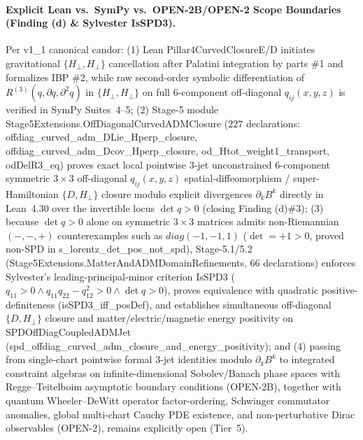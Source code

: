 \documentclass[american,11pt,letterpaper]{article}
\def\mathcal#1{#1}%
\def\mathrm#1{#1}%
\def\texttt#1{#1}%
\begin{document}
\paragraph{Explicit Lean vs.\ SymPy vs.\ \texttt{OPEN-2B}/\texttt{OPEN-2} Scope Boundaries (\texttt{Finding (d)} \& Sylvester \texttt{IsSPD3}).}
Per \texttt{v1\_1} canonical candor: (1) Lean \texttt{Pillar4\allowbreak{}Curved\allowbreak{}Closure\allowbreak{}E/D} initiates gravitational $\{\mathcal{H}_\perp,\mathcal{H}_\perp\}$ cancellation after Palatini integration by parts \#1 and formalizes IBP \#2, while raw second-order symbolic differentiation of $R^{(3)}(q,\partial q,\partial^2 q)$ in $\{\mathcal{H}_\perp,\mathcal{H}_\perp\}$ on full 6-component off-diagonal $q_{ij}(x,y,z)$ is verified in SymPy Suites~4--5; (2) Stage-5 module \texttt{Stage5\allowbreak{}Extensions.\allowbreak{}Off\allowbreak{}Diagonal\allowbreak{}Curved\allowbreak{}ADMClosure} ($227$ declarations: \texttt{offdiag\_\allowbreak{}curved\_\allowbreak{}adm\_\allowbreak{}DLie\_\allowbreak{}Hperp\_\allowbreak{}closure}, \texttt{offdiag\_\allowbreak{}curved\_\allowbreak{}adm\_\allowbreak{}Dcov\_\allowbreak{}Hperp\_\allowbreak{}closure}, \texttt{od\_\allowbreak{}Htot\_\allowbreak{}weight1\_\allowbreak{}transport}, \texttt{odDelR3\_eq}) proves exact local pointwise 3-jet unconstrained 6-component symmetric $3\times 3$ off-diagonal $q_{ij}(x,y,z)$ spatial-diffeomorphism / super-Hamiltonian $\{\mathcal{D},\mathcal{H}_\perp\}$ closure modulo explicit divergences $\partial_k B^k$ directly in Lean~4.30 over the invertible locus $\det q > 0$ (closing \texttt{Finding (d)\#3}); (3) because $\det q > 0$ alone on symmetric $3\times 3$ matrices admits non-Riemannian $(-,-,+)$ counterexamples such as $\mathrm{diag}(-1,-1,1)$ ($\det = +1 > 0$, proved non-SPD in \texttt{s\_\allowbreak{}lorentz\_\allowbreak{}det\_\allowbreak{}pos\_\allowbreak{}not\_\allowbreak{}spd}), Stage-5.1/5.2 (\texttt{Stage5\allowbreak{}Extensions.\allowbreak{}Matter\allowbreak{}And\allowbreak{}ADMDomain\allowbreak{}Refinements}, $66$ declarations) enforces Sylvester's leading-principal-minor criterion \texttt{IsSPD3} ($q_{11} > 0 \wedge q_{11}q_{22}-q_{12}^2 > 0 \wedge \det q > 0$), proves equivalence with quadratic positive-definiteness (\texttt{isSPD3\_iff\_posDef}), and establishes simultaneous off-diagonal $\{\mathcal{D},\mathcal{H}_\perp\}$ closure and matter/electric/magnetic energy positivity on \texttt{SPDOff\allowbreak{}Diag\allowbreak{}Coupled\allowbreak{}ADMJet} (\texttt{spd\_\allowbreak{}offdiag\_\allowbreak{}curved\_\allowbreak{}adm\_\allowbreak{}closure\_\allowbreak{}and\_\allowbreak{}energy\_\allowbreak{}positivity}); and (4) passing from single-chart pointwise formal 3-jet identities modulo $\partial_k B^k$ to integrated constraint algebras on infinite-dimensional Sobolev/Banach phase spaces with Regge--Teitelboim asymptotic boundary conditions (\texttt{OPEN-2B}), together with quantum Wheeler--DeWitt operator factor-ordering, Schwinger commutator anomalies, global multi-chart Cauchy PDE existence, and non-perturbative Dirac observables (\texttt{OPEN-2}), remains explicitly open (Tier~5).
\end{document}
